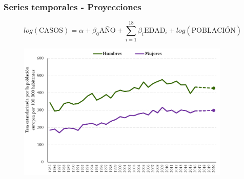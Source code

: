 \documentclass{beamer}
\begin{document}
\begin{frame}\frametitle{Series temporales - Proyecciones}
	
	\vspace{-20pt}
	\centering
	$$log(\text{CASOS}) = \alpha + \beta_0 \text{AÑO} + \sum_{i = 1}^{18} \beta_i \text{EDAD}_i + log(\text{POBLACIÓN})$$
	\vspace{-10pt}
	\begin{figure}
		\centering
		\includegraphics[width=0.9\textwidth]{images/proyecciones1.png}
	\end{figure}
	
\end{frame}

\end{document}

